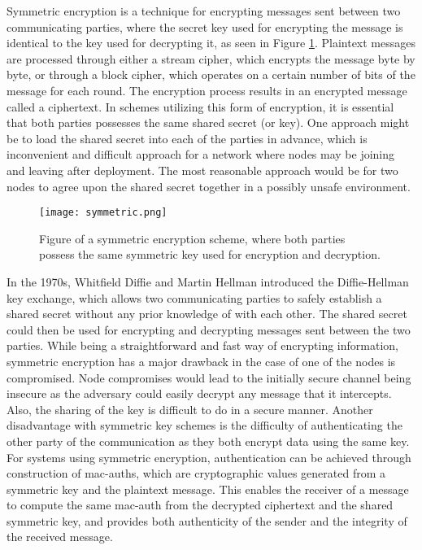Symmetric encryption is a technique for encrypting messages sent between two communicating parties, where the secret key used for encrypting the message is identical to the key used for decrypting it, as seen in Figure \ref{fig:symmetric}. Plaintext messages are processed through either a stream cipher, which encrypts the message byte by byte, or through a block cipher, which operates on a certain number of bits of the message for each round. The encryption process results in an encrypted message called a ciphertext. In schemes utilizing this form of encryption, it is essential that both parties possesses the same shared secret (or key). One approach might be to load the shared secret into each of the parties in advance, which is inconvenient and difficult approach for a network where nodes may be joining and leaving after deployment. The most reasonable approach would be for two nodes to agree upon the shared secret together in a possibly unsafe environment.

\begin{figure}[h]
	\centering
	\texttt{[image: symmetric.png]}
	\caption{Figure of a symmetric encryption scheme, where both parties possess the same symmetric key used for encryption and decryption.}
	\label{fig:symmetric}
\end{figure}

In the 1970s, Whitfield Diffie and Martin Hellman introduced the Diffie-Hellman key exchange, which allows two communicating parties to safely establish a shared secret without any prior knowledge of with each other\cite{diffie1976new}. The shared secret could then be used for encrypting and decrypting messages sent between the two parties.  While being a straightforward and fast way of encrypting information, symmetric encryption has a major drawback in the case of one of the nodes is compromised. Node compromises would lead to the initially secure channel being insecure as the adversary could easily decrypt any message that it intercepts. Also, the sharing of the key is difficult to do in a secure manner. Another disadvantage with symmetric key schemes is the difficulty of authenticating the other party of the communication as they both encrypt data using the same key. For systems using symmetric encryption, authentication can be achieved through construction of \gls{mac-auth}s, which are cryptographic values generated from a symmetric key and the plaintext message. This enables the receiver of a message to compute the same \gls{mac-auth} from the decrypted ciphertext and the shared symmetric key, and provides both authenticity of the sender and the integrity of the received message.


